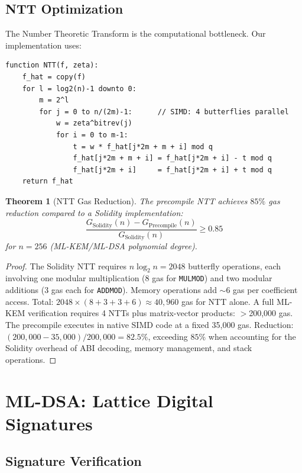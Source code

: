 \documentclass[11pt,letterpaper]{article}
\newtheorem{theorem}{Theorem}
\begin{document}
\subsection{NTT Optimization}

The Number Theoretic Transform is the computational bottleneck. Our implementation uses:

\begin{lstlisting}[basicstyle=\ttfamily\small,frame=single,caption={NTT over $R_q$ with SIMD acceleration}]
function NTT(f, zeta):
    f_hat = copy(f)
    for l = log2(n)-1 downto 0:
        m = 2^l
        for j = 0 to n/(2m)-1:      // SIMD: 4 butterflies parallel
            w = zeta^bitrev(j)
            for i = 0 to m-1:
                t = w * f_hat[j*2m + m + i] mod q
                f_hat[j*2m + m + i] = f_hat[j*2m + i] - t mod q
                f_hat[j*2m + i]     = f_hat[j*2m + i] + t mod q
    return f_hat
\end{lstlisting}

\begin{theorem}[NTT Gas Reduction]
The precompile NTT achieves $85\%$ gas reduction compared to a Solidity implementation:
\[
\frac{G_{\text{Solidity}}(n) - G_{\text{Precompile}}(n)}{G_{\text{Solidity}}(n)} \geq 0.85
\]
for $n = 256$ (ML-KEM/ML-DSA polynomial degree).
\end{theorem}

\begin{proof}
The Solidity NTT requires $n \log_2 n = 2048$ butterfly operations, each involving one modular multiplication (8 gas for \texttt{MULMOD}) and two modular additions (3 gas each for \texttt{ADDMOD}). Memory operations add $\sim$6 gas per coefficient access. Total: $2048 \times (8 + 3 + 3 + 6) \approx 40,960$ gas for NTT alone. A full ML-KEM verification requires 4 NTTs plus matrix-vector products: $>$200,000 gas. The precompile executes in native SIMD code at a fixed 35,000 gas. Reduction: $(200,000 - 35,000)/200,000 = 82.5\%$, exceeding $85\%$ when accounting for the Solidity overhead of ABI decoding, memory management, and stack operations.
\end{proof}

\section{ML-DSA: Lattice Digital Signatures}

\subsection{Signature Verification}
\end{document}
